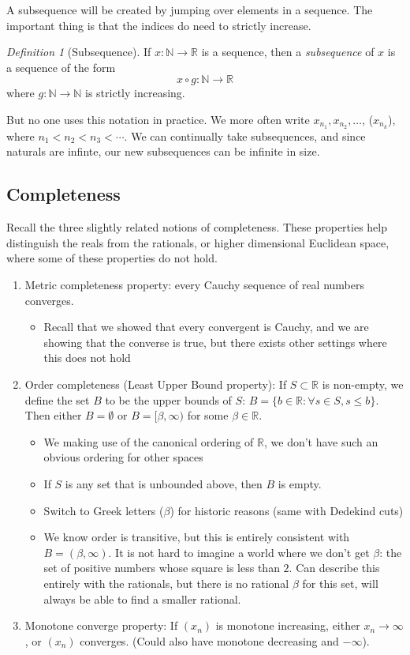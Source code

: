 \documentclass{article}
\theoremstyle{plain}
\theoremstyle{remark}
\newtheorem{definition}{Definition}
\newcommand{\N}{{\mathbb N}}
\newcommand{\R}{{\mathbb R}}
\begin{document}
A subsequence will be created by jumping over elements in a sequence.
The important thing is that the indices do need to strictly increase.

\begin{definition}[Subsequence]
	If $x \colon \N \to \R$ is a sequence,
	then a {\it subsequence} of $x$ is a sequence of the form
	\[
		x \circ g\colon \N \to \R
	\]
	where $g \colon \N \to \N$ is strictly increasing.
\end{definition}
But no one uses this notation in practice.
We more often write $x_{n_1}, x_{n_2}, \dots$, ($x_{n_k}$),
where $n_1 < n_2 < n_3 < \cdots$.
We can continually take subsequences,
and since naturals are infinte,
our new subsequences can be infinite in size.

\subsection{Completeness}
Recall the three slightly related notions of completeness.
These properties help distinguish the reals from the rationals,
or higher dimensional Euclidean space,
where some of these properties do not hold.
\begin{enumerate}
	\item Metric completeness property:
		every Cauchy sequence of real numbers converges.
		\begin{itemize}
			\item Recall that we showed that every convergent is Cauchy,
				and we are showing that the converse is true,
				but there exists other settings where this does not hold
		\end{itemize}
	\item Order completeness (Least Upper Bound property):
		If $S \subset \R$ is non-empty,
		we define the set $B$ to be the upper bounds of $S$:
		$B = \{b\in\R \colon \forall s \in S, s \leq b\}$.
		Then either $B = \emptyset$
		or $B = [\beta,\infty)$ for some $\beta \in \R$.
		\begin{itemize}
			\item We making use of the canonical ordering of $\R$,
				we don't have such an obvious ordering for other spaces
			\item If $S$ is any set that is unbounded above,
				then $B$ is empty.
			\item Switch to Greek letters ($\beta$) for historic reasons
				(same with Dedekind cuts)
			\item We know order is transitive, but this is
				entirely consistent with $B = (\beta, \infty)$.
				It is not hard to imagine a world where we don't get $\beta$:
				the set of positive numbers whose square is less than $2$.
				Can describe this entirely with the rationals,
				but there is no rational $\beta$ for this set,
				will always be able to find a smaller rational.
		\end{itemize}
	\item Monotone converge property:
		If $(x_n)$ is monotone increasing,
		either $x_n \to \infty$, or $(x_n)$ converges.
		(Could also have monotone decreasing and $-\infty$).
\end{enumerate}
\end{document}
